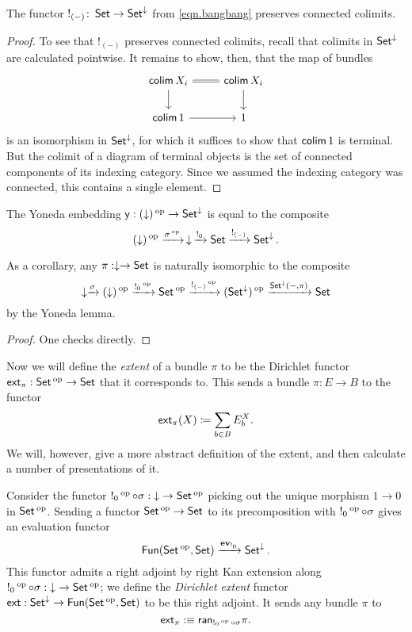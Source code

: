 \begin{lem}\label{lem:bang.preserves.connected.colimits}
  The functor $!_{(-)}\colon\Set\to\Set^{\down}$ from \eqref{eqn.bangbang} preserves connected colimits.
\end{lem}
\begin{proof}
  To see that $!_{(-)}$ preserves connected colimits, recall that colimits in $\Set^{\down}$ are calculated pointwise. It remains to show, then, that the map of bundles
  \[
    \begin{tikzcd}
    \colim X_i \arrow[r, equals] \arrow[d] & \colim X_i \arrow[d] \\
    \colim 1 \arrow[r] & 1 
    \end{tikzcd}
  \]
  is an isomorphism in $\Set^{\down}$, for which it suffices to show that
  $\colim 1$ is terminal. But the colimit of a diagram of terminal objects is the set
  of connected components of its indexing category. Since we assumed the
  indexing category was connected, this contains a single element.
\end{proof}

\begin{lem}\label{lem:set.bundle.yoneda}
The Yoneda embedding $\yo : (\downarrow)\op \to \Set^{\downarrow}$ is equal to the
composite $$(\downarrow)\op \xto{\sigma\op} \,\downarrow\, \xto{!_{0}} \Set
\xto{!_{(-)}} \Set^{\downarrow}.$$

As a corollary, any $\pi : \downarrow \to \Set$ is naturally isomorphic to the composite
$$\downarrow \xto{\sigma} (\downarrow)\op \xto{!_0\op} \Set\op \xto{!_{(-)}\op}
(\Set^{\downarrow})\op \xto{\Set^{\downarrow}(-, \pi)} \Set$$
by the Yoneda lemma.
\end{lem}
\begin{proof}
One checks directly.
\end{proof}

Now we will define the \emph{extent} of a bundle $\pi$ to be the Dirichlet functor $\ext_\pi: \Set\op\to\Set$ that it
corresponds to. This sends a bundle
$\pi : E \to B$ to the functor
$$\ext_\pi(X)\coloneqq \sum_{b \in B} E_b^X.$$
We will, however, give a more abstract definition of the extent, and then
calculate a number of presentations of it.

\begin{defn}\label{def.extent}
  Consider the functor $!_0\op \circ \sigma : \down \to \Set\op$ picking out the
  unique morphism $1\to 0$ in $\Set\op$. Sending a functor $\Set\op\to\Set$ to
  its precomposition with $!_0\op \circ\sigma$ gives an evaluation functor
  $$\Fun(\Set\op, \Set)\xto{\ev_{!_0}} \Set^{\down}.$$
  This functor admits a right adjoint by right Kan extension along $!_0\op \circ
  \sigma : \down \to \Set\op$; we define the
  \emph{Dirichlet extent} functor $\ext : \Set^{\down} \to \Fun(\Set\op,
  \Set)$ to be this right adjoint. It sends any bundle $\pi$ to
  $$\ext_{\pi} :\equiv \term{ran}_{!_0\op \circ \sigma} \pi.$$
\end{defn}


